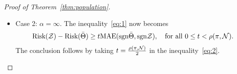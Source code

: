 \documentclass[11pt]{article}
\theoremstyle{plain}
\theoremstyle{definition}
\def\sign{\textup{sgn}}
\def\risk{\textup{Risk}}
\begin{document}
\begin{proof}[Proof of Theorem~\ref{thm:population}]
\begin{itemize}[leftmargin=*,topsep=0pt,itemsep=-1ex,partopsep=1ex,parsep=1ex]
By~\eqref{eq:population2}, for all $0\leq t< \rho(\pi, \tN)$,
\begin{align}\label{eq:1}
\risk(\tZ)- \risk(\bar \Theta) &\geq t\mathbb{E}\left(|\sign \tZ- \sign \hat\Theta|\mathds{1}\{|\hat\Theta|>t\}\right)
\notag \\
&\geq 2t\mathbb{P}\left(\sign\tZ \neq \sign \bar \Theta\text{ and }|\bar \Theta|>t   \right)\notag \\
& \geq 2t\Big\{\mathbb{P}\left(\sign\tZ \neq \sign \bar \Theta \right) - \mathbb{P}\left(|\bar \Theta|\leq t\right)\Big\}\notag\\
&\geq t\Big\{\textup{MAE}(\sign \tZ, \sign \bar \Theta) - 2ct^\alpha \Big\},
\end{align}
where the last line follows from the definition of MAE and~\eqref{eq:ass}. We maximize the lower bound~\eqref{eq:1} with respect to $t$, and obtain the optimal $t_{\text{opt}}$,
\[
t_{\text{opt}}=\begin{cases}
\rho(\pi, \tN), & \text{if } \textup{MAE}(\sign \tZ,\sign \bar\Theta) > 2c(1+\alpha) \rho^{\alpha}(\pi, \tN),\\
\left[ {1\over 2c(1+\alpha)} \textup{MAE} (\sign \tZ,\sign \bar\Theta)  \right]^{1/\alpha}, &  \text{if }\textup{MAE}( \sign \tZ,\sign \bar\Theta) \leq 2c(1+\alpha) \rho^{\alpha}(\pi, \tN).
 \end{cases}
\]
The corresponding lower bound of the inequality~\eqref{eq:1} becomes
\[
\risk(\tZ)- \risk(\bar \Theta) \geq 
\begin{cases}
c_1 \rho(\pi, \tN) \textup{MAE}(\sign \tZ,\sign \bar\Theta),  & \text{if } \textup{MAE}(\sign \tZ,\sign \bar\Theta) > 2c(1+\alpha) \rho^{\alpha}(\pi, \tN),\\
c_2 \left[ \textup{MAE}( \sign \tZ,\sign \bar\Theta)\right]^{1+\alpha \over \alpha}, & \text{if }\textup{MAE}(\sign \tZ,\sign \bar\Theta) \leq 2c(1+\alpha) \rho^{\alpha}(\pi, \tN),
\end{cases}
\]
where $c_1,c_2>0$ are two constants independent of $\tZ$. Combining both cases gives
\begin{align}\label{eq:MAE}
\textup{MAE}(\sign \tZ,\sign \bar\Theta) & \lesssim [\risk(\tZ)- \risk(\bar \Theta)]^{\alpha\over 1+\alpha}+{1\over \rho(\pi, \tN)} \left[\risk(\tZ)- \risk(\bar \Theta)\right]\\
&\leq C(\pi)[\risk(\tZ)- \risk(\bar \Theta)]^{\alpha\over 1+\alpha},
\end{align}
where $C(\pi)>0$ is a multiplicative factor independent of $\tZ$. 
\item Case 2: $\alpha=\infty$. The inequality~\eqref{eq:1} now becomes
\begin{equation}\label{eq:2}
\risk(\tZ)- \risk(\bar \Theta) \geq t\textup{MAE}(\sign \bar\Theta, \sign \tZ), \quad \text{for all }0\leq t< \rho(\pi,\tN).
\end{equation}
The conclusion follows by taking $t={\rho(\pi, \mathcal{N})\over 2}$ in the inequality~\eqref{eq:2}. 
\end{itemize}
\end{proof}
\end{document}
